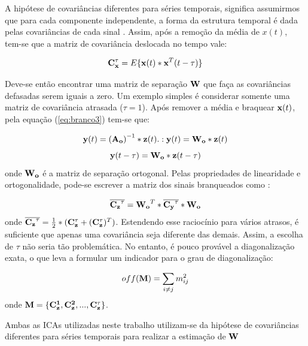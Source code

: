 \documentclass[a4paper,12pt]{monografia}
\theoremstyle{plain}
\theoremstyle{definition}
\theoremstyle{remark}
\begin{document}
A hipótese de covariâncias diferentes para séries temporais, significa assumirmos que para cada componente independente, a forma da estrutura temporal é dada pelas covariâncias de cada sinal \cite{faier2011analise}. Assim, após a remoção da média de $x(t)$, tem-se que a matriz de covariância deslocada no tempo vale:

\begin{equation}
   {\bf C_{x}^{\tau}} = E\{{\bf x}(t)*{\bf x}^{T}(t-\tau)\}
    \label{eq:branco4}
\end{equation}

Deve-se então encontrar uma matriz de separação ${\bf W}$ que faça as covariâncias defasadas serem iguais a zero. Um exemplo simples é considerar somente uma matriz de covariância atrasada ($\tau = 1$). Após remover a média e braquear ${\bf x}(t)$, pela equação (\ref{eq:branco3}) tem-se que:

\begin{equation}
   {\bf y}(t) = \left({\bf A_{o}}\right)^{-1} * {\bf z}(t) .: {\bf y}(t) = {\bf W_{o}} * {\bf z}(t)
    \label{eq:branco5}
\end{equation}
\begin{equation}
   {\bf y}(t-\tau) = {\bf W_{o}} * {\bf z}(t-\tau)
    \label{eq:branco6}
\end{equation}
onde ${\bf W_{o}}$ é a matriz de separação ortogonal. Pelas propriedades de linearidade e ortogonalidade, pode-se escrever a matriz dos sinais branqueados como \cite{faier2011analise}: 

\begin{equation}
   \overline{{\bf C_{z}}^{\tau}} =  {\bf W_{o}}^{T}*\overline{{\bf C_{y}}^{\tau}}*{\bf W_{o}}
    \label{eq:branco7}
\end{equation}
onde $\overline{{\bf C_{z}}^{\tau}}=\frac{1}{2}*({\bf C_{z}^{\tau}+(C_{z}^{\tau}})^{T})$. Estendendo esse raciocínio para vários atrasos, é suficiente que apenas uma covariância seja diferente das demais. Assim, a escolha de $\tau$ não seria tão problemática. No entanto, é pouco provável a diagonalização exata, o que leva a formular um indicador para o grau de diagonalização:

\begin{equation}
   off({\bf M}) =  \sum_{i \neq j}m^{2}_{ij}
    \label{eq:branco8}
\end{equation}
onde ${\bf M = \{C_{z}^{1},C_{z}^{2},...,C_{z}^{\tau}\}}$. 

Ambas as ICAs utilizadas neste trabalho utilizam-se da hipótese de covariâncias diferentes para séries temporais para realizar a estimação de $\bf W$
\end{document}
